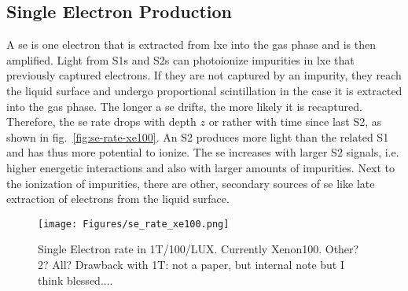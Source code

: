
\FloatBarrier
\subsection{Single Electron Production}
\label{ssec:se-source}
\FloatBarrier


A \gls{se} is one electron that is extracted from \gls{lxe} into the gas phase and is then amplified.
Light from S1s and S2s can photoionize impurities in \gls{lxe} that previously captured electrons.
If they are not captured by an impurity, they reach the liquid surface and undergo proportional scintillation in the case it is extracted into the gas phase.
The longer a \gls{se} drifts, the more likely it is recaptured.
Therefore, the \gls{se} rate drops with depth $ z $ or rather with time since last S2, as shown in fig.~\ref{fig:se-rate-xe100}.  %
An S2 produces more light than the related S1 and has thus more potential to ionize.
The \gls{se} increases with larger S2 signals, i.e. higher energetic interactions and also with larger amounts of impurities\cite{?}.  %
Next to the ionization of impurities, there are other, secondary sources of \gls{se} like late extraction of electrons from the liquid surface.


\begin{figure}
    \centering
    \texttt{[image: Figures/se\_rate\_xe100.png]}  %
    \caption[Single Electron Rate in 1T/100/LUX]{
        Single Electron rate in 1T/100/LUX. Currently Xenon100. Other? 2? All? Drawback with 1T: not a paper, but internal note but I think blessed...\cite{Aprile2014}.
    }
    \label{fig:se-rate}
\end{figure}




